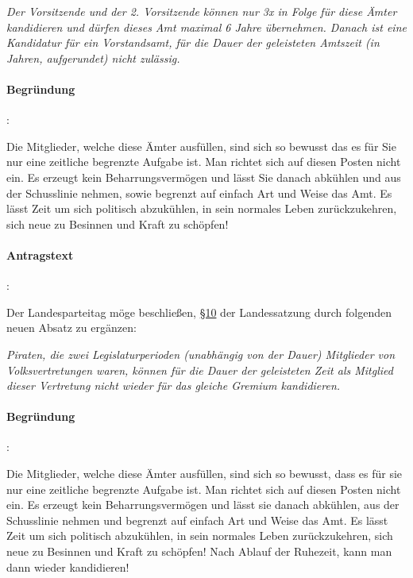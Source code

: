 \textit{Der Vorsitzende und der 2. Vorsitzende können nur 3x in Folge für diese Ämter kandidieren und dürfen dieses Amt maximal 6 Jahre übernehmen. Danach ist eine Kandidatur für ein Vorstandsamt, für die Dauer der geleisteten Amtszeit (in Jahren, aufgerundet) nicht zulässig.}

\paragraph{Begründung}:

Die Mitglieder, welche diese Ämter ausfüllen, sind sich so bewusst das es für Sie nur eine zeitliche begrenzte Aufgabe ist. Man richtet sich auf diesen Posten nicht ein. Es erzeugt kein Beharrungsvermögen und lässt Sie danach abkühlen und aus der Schusslinie nehmen, sowie begrenzt auf einfach Art und Weise das Amt. Es lässt Zeit um sich politisch abzukühlen, in sein normales Leben zurückzukehren, sich neue zu Besinnen und Kraft zu schöpfen!



\paragraph{Antragstext}:

Der Landesparteitag möge beschließen, \href{http://wiki.piratenpartei.de/LSA:Satzung#.C2.A7_10_-_Bewerberaufstellung_f.C3.BCr_die_Wahlen_zu_Volksvertretungen}{§10} der Landessatzung durch folgenden neuen Absatz zu ergänzen:

\textit{Piraten, die zwei Legislaturperioden (unabhängig von der Dauer) Mitglieder von Volksvertretungen waren, können für die Dauer der geleisteten Zeit als Mitglied dieser Vertretung nicht wieder für das gleiche Gremium kandidieren.}

\paragraph{Begründung}:

Die Mitglieder, welche diese Ämter ausfüllen, sind sich so bewusst, dass es für sie nur eine zeitliche begrenzte Aufgabe ist. Man richtet sich auf diesen Posten nicht ein. Es erzeugt kein Beharrungsvermögen und lässt sie danach abkühlen, aus der Schusslinie nehmen und begrenzt auf einfach Art und Weise das Amt. Es lässt Zeit um sich politisch abzukühlen, in sein normales Leben zurückzukehren, sich neue zu Besinnen und Kraft zu schöpfen! Nach Ablauf der Ruhezeit, kann man dann wieder kandidieren!

